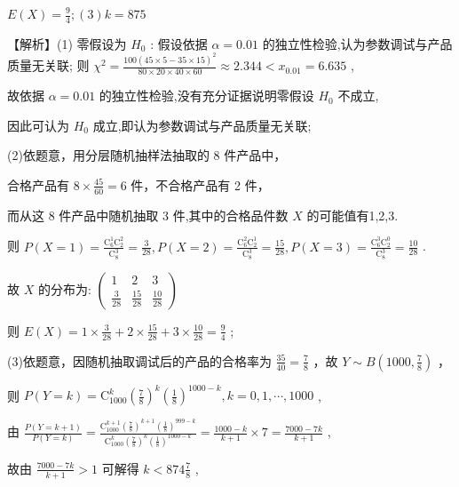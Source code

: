 \documentclass[10pt]{article}
\begin{document}
\(E\left( X\right)  = \frac{9}{4};\left( 3\right) k = {875}\)

【解析】(1) 零假设为 \({H}_{0}\) : 假设依据 \(\alpha  = {0.01}\) 的独立性检验,认为参数调试与产品质量无关联; 则 \({\chi }^{2} = \frac{{100}{\left( {45} \times  5 - {35} \times  {15}\right) }^{2}}{{80} \times  {20} \times  {40} \times  {60}} \approx  {2.344} < {x}_{0.01} = {6.635}\) ,

故依据 \(\alpha  = {0.01}\) 的独立性检验,没有充分证据说明零假设 \({H}_{0}\) 不成立,

因此可认为 \({H}_{0}\) 成立,即认为参数调试与产品质量无关联;

(2)依题意，用分层随机抽样法抽取的 8 件产品中，

合格产品有 \(8 \times  \frac{45}{60} = 6\) 件，不合格产品有 2 件，

而从这 8 件产品中随机抽取 3 件,其中的合格品件数 \(X\) 的可能值有1,2,3.

则 \(P\left( {X = 1}\right)  = \frac{{\mathrm{C}}_{6}^{1}{\mathrm{C}}_{2}^{2}}{{\mathrm{C}}_{8}^{3}} = \frac{3}{28},P\left( {X = 2}\right)  = \frac{{\mathrm{C}}_{6}^{2}{\mathrm{C}}_{2}^{1}}{{\mathrm{C}}_{8}^{3}} = \frac{15}{28},P\left( {X = 3}\right)  = \frac{{\mathrm{C}}_{6}^{3}{\mathrm{C}}_{2}^{0}}{{\mathrm{C}}_{8}^{3}} = \frac{10}{28}\) .

故 \(X\) 的分布为: \(\left( \begin{matrix} 1 & 2 & 3 \\  \frac{3}{28} & \frac{15}{28} & \frac{10}{28} \end{matrix}\right)\)

则 \(E\left( X\right)  = 1 \times  \frac{3}{28} + 2 \times  \frac{15}{28} + 3 \times  \frac{10}{28} = \frac{9}{4}\) ;

(3)依题意，因随机抽取调试后的产品的合格率为 \(\frac{35}{40} = \frac{7}{8}\) ，故 \(Y \sim  B\left( {{1000},\frac{7}{8}}\right)\) ，

则 \(P\left( {Y = k}\right)  = {\mathrm{C}}_{1000}^{k}{\left( \frac{7}{8}\right) }^{k}{\left( \frac{1}{8}\right) }^{{1000} - k},k = 0,1,\cdots ,{1000}\) ,

由 \(\frac{P\left( {Y = k + 1}\right) }{P\left( {Y = k}\right) } = \frac{{\mathrm{C}}_{1000}^{k + 1}{\left( \frac{7}{8}\right) }^{k + 1}{\left( \frac{1}{8}\right) }^{{999} - k}}{{\mathrm{C}}_{1000}^{k}{\left( \frac{7}{8}\right) }^{k}{\left( \frac{1}{8}\right) }^{{1000} - k}} = \frac{{1000} - k}{k + 1} \times  7 = \frac{{7000} - {7k}}{k + 1}\) ,

故由 \(\frac{{7000} - {7k}}{k + 1} > 1\) 可解得 \(k < {874}\frac{7}{8}\) ,
\end{document}
